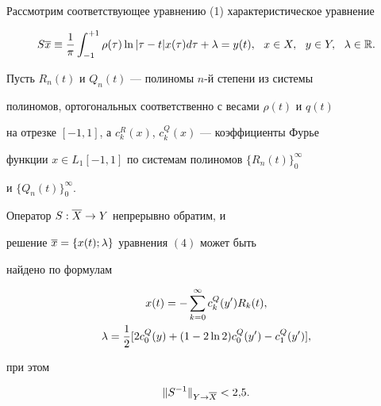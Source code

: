 Рассмотрим  соответствующее  уравнению (1) характеристическое уравнение


\begin{equation}


S\ol{x}\equiv \frac{1}{\pi}\int_{-1}^{+1}\rho(\tau)


\ln|\tau-t|x(\tau)d\tau+\lambda = y(t),\ \ x\in X,\ \


y\in Y,\ \ \lambda\in \R.


\end{equation}





Пусть $R_n(t)$ и $Q_n(t)$ --- полиномы $n$-й степени из системы 


полиномов, ортогональных соответственно с весами $\rho(t)$ и $q(t)$ 


на отрезке $[-1,1]$, а $c_k^R(x)$, $c_k^Q(x)$ --- коэффициенты Фурье 


функции $x\in L_1[-1,1]$ по системам полиномов $\{R_n(t)\}_0^\infty$


и $\{Q_n(t)\}_0^\infty$.








\begin{thm}


Оператор $S:\overline{X}\to Y$  непрерывно обратим, и 


решение $\overline{x}=\{x(t);\lambda\}$ уравнения $(4)$ может быть 


найдено по формулам


\begin{gather}


x(t) = -\sum_{k=0}^\infty c_k^Q(y')R_k(t),\notag \\


%


\lambda = \frac{1}{2}[2c_0^Q(y) + (1-2\ln 2)c_0^Q(y') - c_1^Q(y')],


\end{gather}


при этом


\begin{equation}


\|S^{-1}\|_{Y\to \ol{X}}< 2{,}5.


\end{equation}


\end{thm}








